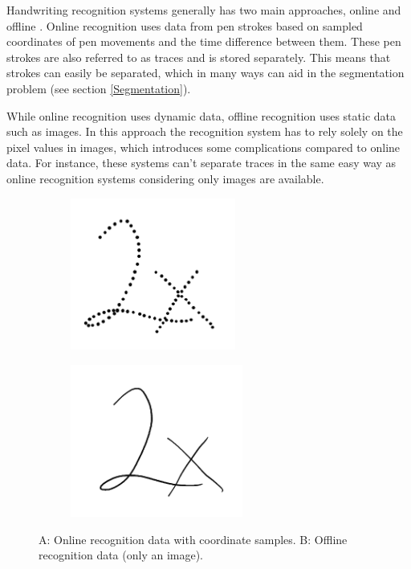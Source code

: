 Handwriting recognition systems generally has two main approaches, online and offline \cite{priya_online_2016}. Online recognition uses data from pen strokes based on sampled coordinates of pen movements and the time difference between them. These pen strokes are also referred to as traces and is stored separately. This means that strokes can easily be separated, which in many ways can aid in the segmentation problem (see section \ref{Segmentation}).  

While online recognition uses dynamic data, offline recognition uses static data such as images. In this approach the recognition system has to rely solely on the pixel values in images, which introduces some complications compared to online data. For instance, these systems can't separate traces in the same easy way as online recognition systems considering only images are available.

\begin{figure}[H]
\centering
\begin{subfigure}{0.3\textwidth}
\includegraphics[width=1.1\linewidth, height=5cm]{Assets/Chapter2_Theory/segmentation_2_on.png} 
\caption{}
\label{fig:online_data}
\end{subfigure}
\begin{subfigure}{0.3\textwidth}
\includegraphics[width=1.1\linewidth, height=5cm]{Assets/Chapter2_Theory/segmentation_2.png}
\caption{}
\label{fig:offline_data}
\end{subfigure}
\caption{A: Online recognition data with coordinate samples. B: Offline recognition data (only an image).}
\label{fig:online_offline_comparison}
\end{figure}

